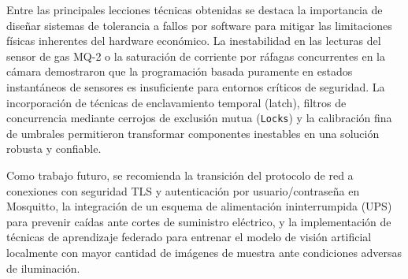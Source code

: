 \documentclass[12pt,letterpaper]{article}
\begin{document}
Entre las principales lecciones técnicas obtenidas se destaca la importancia de diseñar sistemas de tolerancia a fallos por software para mitigar las limitaciones físicas inherentes del hardware económico. La inestabilidad en las lecturas del sensor de gas MQ-2 o la saturación de corriente por ráfagas concurrentes en la cámara demostraron que la programación basada puramente en estados instantáneos de sensores es insuficiente para entornos críticos de seguridad. La incorporación de técnicas de enclavamiento temporal (latch), filtros de concurrencia mediante cerrojos de exclusión mutua (\texttt{Locks}) y la calibración fina de umbrales permitieron transformar componentes inestables en una solución robusta y confiable.

Como trabajo futuro, se recomienda la transición del protocolo de red a conexiones con seguridad TLS y autenticación por usuario/contraseña en Mosquitto, la integración de un esquema de alimentación ininterrumpida (UPS) para prevenir caídas ante cortes de suministro eléctrico, y la implementación de técnicas de aprendizaje federado para entrenar el modelo de visión artificial localmente con mayor cantidad de imágenes de muestra ante condiciones adversas de iluminación.
\end{document}
